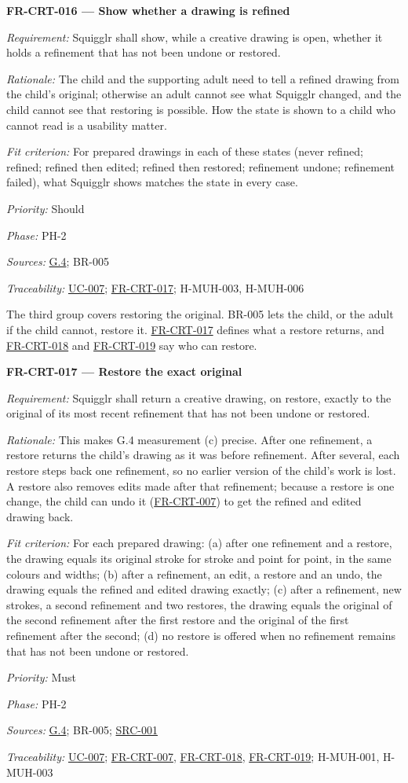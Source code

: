 \documentclass[12pt]{article}
\renewcommand{\_}{\textunderscore\allowbreak}%
\newcommand{\goalref}[1]{\hyperref[goal:#1]{G.#1}}
\newcommand{\ucref}[1]{\hyperref[uc:#1]{\mbox{UC-#1}}}
\newenvironment{srsrequirement}[2]{%
  \par\medskip\noindent\phantomsection\label{req:#1}%
  \textbf{#1 --- #2}\par\nobreak\smallskip }{\par\medskip}
\newcommand{\reqfield}[2]{\noindent\textit{#1:} #2\par}
\newcommand{\reqshall}[1]{\reqfield{Requirement}{#1}}
\newcommand{\reqrationale}[1]{\reqfield{Rationale}{#1}}
\newcommand{\reqfit}[1]{\reqfield{Fit criterion}{#1}}
\newcommand{\reqpriority}[1]{\reqfield{Priority}{#1}}
\newcommand{\reqphase}[1]{\reqfield{Phase}{#1}}
\newcommand{\reqsources}[1]{\reqfield{Sources}{#1}}
\newcommand{\reqtraces}[1]{\reqfield{Traceability}{#1}}
\newcommand{\reqref}[1]{\hyperref[req:#1]{#1}}
\newcommand{\srcref}[1]{\hyperref[src:#1]{SRC-#1}}
\providecommand{\ucref}[1]{\hyperref[uc:#1]{UC-#1}}
\begin{document}
\begin{srsrequirement}{FR-CRT-016}{Show whether a drawing is refined}
  \reqshall{Squigglr shall show, while a creative drawing is open, whether it
holds a refinement that has not been undone or restored.} \reqrationale{The
child and the supporting adult need to tell a refined drawing from the child's
original; otherwise an adult cannot see what Squigglr changed, and the child
cannot see that restoring is possible. How the state is shown to a child who
cannot read is a usability matter.} \reqfit{For prepared drawings in each of
these states (never refined; refined; refined then edited; refined then
restored; refinement undone; refinement failed), what Squigglr shows matches the
state in every case.}
  \reqpriority{Should}
  \reqphase{PH-2}
  \reqsources{\goalref{4}; BR-005} \reqtraces{\ucref{007}; \reqref{FR-CRT-017};
  H-MUH-003, H-MUH-006}
\end{srsrequirement}

The third group covers restoring the original. BR-005 lets the child, or the
adult if the child cannot, restore it. \reqref{FR-CRT-017} defines what a
restore returns, and \reqref{FR-CRT-018} and \reqref{FR-CRT-019} say who can
restore.

\begin{srsrequirement}{FR-CRT-017}{Restore the exact original}
  \reqshall{Squigglr shall return a creative drawing, on restore, exactly to the
original of its most recent refinement that has not been undone or restored.}
\reqrationale{This makes G.4 measurement (c) precise. After one refinement, a
restore returns the child's drawing as it was before refinement. After several,
each restore steps back one refinement, so no earlier version of the child's
work is lost. A restore also removes edits made after that refinement; because a
restore is one change, the child can undo it (\reqref{FR-CRT-007}) to get the
refined and edited drawing back.} \reqfit{For each prepared drawing: (a) after
one refinement and a restore, the drawing equals its original stroke for stroke
and point for point, in the same colours and widths; (b) after a refinement, an
edit, a restore and an undo, the drawing equals the refined and edited drawing
exactly; (c) after a refinement, new strokes, a second refinement and two
restores, the drawing equals the original of the second refinement after the
first restore and the original of the first refinement after the second; (d) no
restore is offered when no refinement remains that has not been undone or
restored.}
  \reqpriority{Must}
  \reqphase{PH-2}
  \reqsources{\goalref{4}; BR-005; \srcref{001}} \reqtraces{\ucref{007};
  \reqref{FR-CRT-007}, \reqref{FR-CRT-018}, \reqref{FR-CRT-019}; H-MUH-001,
  H-MUH-003}
\end{srsrequirement}
\end{document}
